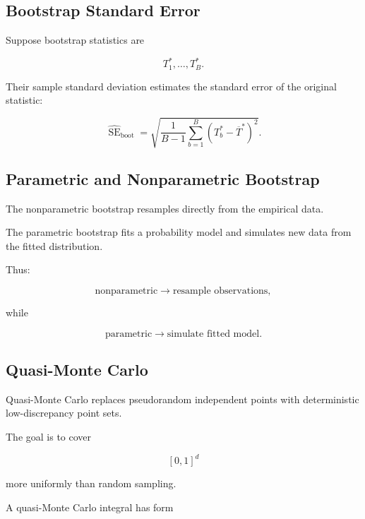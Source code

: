 \subsection{Bootstrap Standard Error}
\label{subsec:bootstrap-standard-error}

Suppose bootstrap statistics are

\[
T_1^*,\ldots,T_B^*.
\]

Their sample standard deviation estimates the standard error of the
original statistic:

\[
\boxed{
\widehat{\operatorname{SE}}_{\mathrm{boot}}
=
\sqrt{
\frac1{B-1}
\sum_{b=1}^{B}
\left(
T_b^*
-
\overline{T}^*
\right)^2
}.
}
\]

\subsection{Parametric and Nonparametric Bootstrap}
\label{subsec:parametric-nonparametric-bootstrap}

The nonparametric bootstrap resamples directly from the empirical data.

The parametric bootstrap fits a probability model and simulates new data
from the fitted distribution.

Thus:

\[
\boxed{
\text{nonparametric}
\rightarrow
\text{resample observations},
}
\]

while

\[
\boxed{
\text{parametric}
\rightarrow
\text{simulate fitted model}.
}
\]

\subsection{Quasi-Monte Carlo}
\label{subsec:quasi-monte-carlo}

Quasi-Monte Carlo replaces pseudorandom independent points with
deterministic low-discrepancy point sets.

The goal is to cover

\[
[0,1]^d
\]

more uniformly than random sampling.

A quasi-Monte Carlo integral has form

